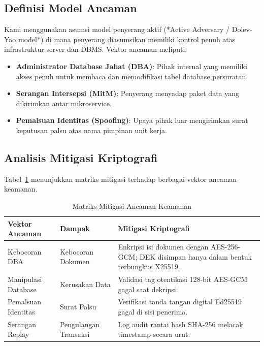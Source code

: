 \documentclass[conference]{IEEEtran}
\begin{document}
\subsection{Definisi Model Ancaman}
Kami menggunakan asumsi model penyerang aktif (*Active Adversary / Dolev-Yao model*) di mana penyerang diasumsikan memiliki kontrol penuh atas infrastruktur server dan DBMS. Vektor ancaman meliputi:
\begin{itemize}
    \item \textbf{Administrator Database Jahat (DBA)}: Pihak internal yang memiliki akses penuh untuk membaca dan memodifikasi tabel database persuratan.
    \item \textbf{Serangan Intersepsi (MitM)}: Penyerang menyadap paket data yang dikirimkan antar mikroservice.
    \item \textbf{Pemalsuan Identitas (Spoofing)}: Upaya pihak luar mengirimkan surat keputusan palsu atas nama pimpinan unit kerja.
\end{itemize}

\subsection{Analisis Mitigasi Kriptografi}
Tabel~\ref{tab:threats} menunjukkan matriks mitigasi terhadap berbagai vektor ancaman keamanan.

\begin{table}[htbp]
\caption{Matriks Mitigasi Ancaman Keamanan}
\begin{center}
\begin{tabular}{llp{3.5cm}}
\toprule
\textbf{Vektor Ancaman} & \textbf{Dampak} & \textbf{Mitigasi Kriptografi} \\
\midrule
Kebocoran DBA & Kebocoran Dokumen & Enkripsi isi dokumen dengan AES-256-GCM; DEK disimpan hanya dalam bentuk terbungkus X25519. \\
\midrule
Manipulasi Database & Kerusakan Data & Validasi tag otentikasi 128-bit AES-GCM gagal saat dekripsi. \\
\midrule
Pemalsuan Identitas & Surat Palsu & Verifikasi tanda tangan digital Ed25519 gagal di sisi penerima. \\
\midrule
Serangan Replay & Pengulangan Transaksi & Log audit rantai hash SHA-256 melacak timestamp secara urut. \\
\bottomrule
\end{tabular}
\label{tab:threats}
\end{center}
\end{table}
\end{document}
